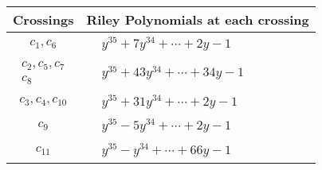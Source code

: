 \documentclass[1p]{elsarticle_modified}
\theoremstyle{definition}
\begin{document}
\begin{tabular}{m{50pt}|m{274pt}}
Crossings & \hspace{64pt}Riley Polynomials at each crossing \\
\hline $$\begin{aligned}c_{1},c_{6}\end{aligned}$$&$\begin{aligned}
&y^{35}+7 y^{34}+\cdots+2 y-1
\end{aligned}$\\
\hline $$\begin{aligned}c_{2},c_{5},c_{7}\\c_{8}\end{aligned}$$&$\begin{aligned}
&y^{35}+43 y^{34}+\cdots+34 y-1
\end{aligned}$\\
\hline $$\begin{aligned}c_{3},c_{4},c_{10}\end{aligned}$$&$\begin{aligned}
&y^{35}+31 y^{34}+\cdots+2 y-1
\end{aligned}$\\
\hline $$\begin{aligned}c_{9}\end{aligned}$$&$\begin{aligned}
&y^{35}-5 y^{34}+\cdots+2 y-1
\end{aligned}$\\
\hline $$\begin{aligned}c_{11}\end{aligned}$$&$\begin{aligned}
&y^{35}- y^{34}+\cdots+66 y-1
\end{aligned}$\\
\hline
\end{tabular}
\vskip 2pc
\end{document}
